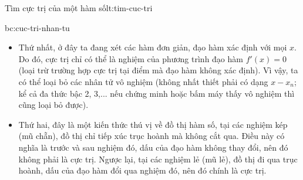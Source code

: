 \begin{lythuyetbox}{Tìm cực trị của một hàm số}{lt:tim-cuc-tri}
\begin{banchat}{}{bc:cuc-tri-nhan-tu}
\begin{itemize}
    \item Thứ nhất, ở đây ta đang xét các hàm đơn giản, đạo hàm xác định với mọi $x$. Do đó, cực trị chỉ có thể là nghiệm của phương trình đạo hàm $f'(x) = 0$ (loại trừ trường hợp cực trị tại điểm mà đạo hàm không xác định). Vì vậy, ta có thể loại bỏ các nhân tử vô nghiệm (không nhất thiết phải có dạng $x-x_n$; kể cả đa thức bậc 2, 3,... nếu chứng minh hoặc bấm máy thấy vô nghiệm thì cũng loại bỏ được).
    \item Thứ hai, đây là một kiến thức thú vị về đồ thị hàm số, tại các nghiệm kép (mũ chẵn), đồ thị chỉ tiếp xúc trục hoành mà không cắt qua. Điều này có nghĩa là trước và sau nghiệm đó, dấu của đạo hàm không thay đổi, nên đó không phải là cực trị. Ngược lại, tại các nghiệm lẻ (mũ lẻ), đồ thị đi qua trục hoành, dấu của đạo hàm đổi qua nghiệm đó, nên đó chính là cực trị.
\end{itemize}
\begin{center}
\end{center}
\end{banchat}

\end{lythuyetbox}

